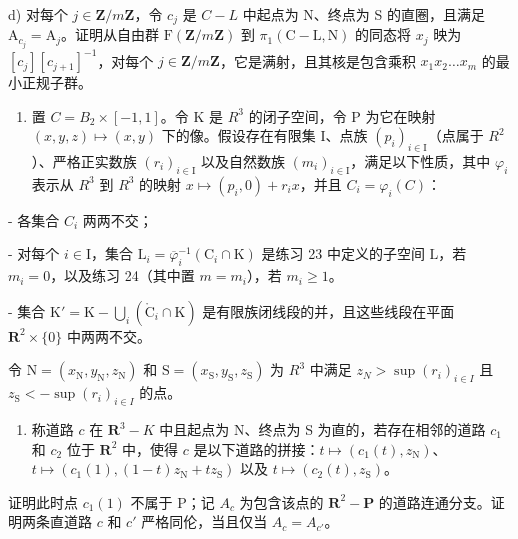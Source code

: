 d) 对每个 \(j \in \mathbf{Z}/m\mathbf{Z}\)，令 \(c_j\) 是 \(C-L\) 中起点为 N、终点为 S 的直圈，且满足 \(\mathrm{A}_{c_j} = \mathrm{A}_j\)。证明从自由群 \(\mathrm{F}(\mathbf{Z}/m\mathbf{Z})\) 到 \(\pi_1(\mathrm{C}-\mathrm{L},\mathrm{N})\) 的同态将 \(x_j\) 映为 \([c_j][c_{j+1}]^{-1}\)，对每个 \(j \in \mathbf{Z}/m\mathbf{Z}\)，它是满射，且其核是包含乘积 \(x_1x_2 \ldots x_m\) 的最小正规子群。

\begin{enumerate}
\def\labelenumi{\arabic{enumi})}
\setcounter{enumi}{24}
\tightlist
\item
   置 \(C = B_{2} \times [-1, 1]\)。令 K 是 \(R^{3}\) 的闭子空间，令 P 为它在映射 \((x, y, z) \mapsto (x, y)\) 下的像。假设存在有限集 I、点族 \((p_{i})_{i \in \mathrm{I}}\)（点属于 \(R^{2}\)）、严格正实数族 \((r_{i})_{i \in \mathrm{I}}\) 以及自然数族 \((m_{i})_{i \in \mathrm{I}}\)，满足以下性质，其中 \(\varphi_{i}\) 表示从 \(R^{3}\) 到 \(R^{3}\) 的映射 \(x \mapsto (p_{i}, 0) + r_{i}x\)，并且 \(C_{i} = \varphi_{i}(C) \)：
\end{enumerate}

- 各集合 \(C_{i}\) 两两不交；

- 对每个 \(i \in \mathrm{I}\)，集合 \(\mathrm{L}_i = \overline{\varphi}_i^{-1}(\mathrm{C}_i \cap \mathrm{K})\) 是练习 23 中定义的子空间 \(\mathrm{L}\)，若 \(m_i = 0\)，以及练习 24（其中置 \(m = m_i\)），若 \(m_i \geqslant 1\)。

- 集合 \(\mathrm{K}' = \mathrm{K} - \bigcup_{i} (\mathring{\mathrm{C}}_i \cap \mathrm{K})\) 是有限族闭线段的并，且这些线段在平面 \(\mathbf{R}^2 \times \{0\}\) 中两两不交。

令 \(\mathrm{N} = (x_{\mathrm{N}}, y_{\mathrm{N}}, z_{\mathrm{N}})\) 和 \(\mathrm{S} = (x_{\mathrm{S}}, y_{\mathrm{S}}, z_{\mathrm{S}})\) 为 \(R^{3}\) 中满足 \(z_{N} > \sup(r_{i})_{i \in I}\) 且 \(z_{\mathrm{S}} < -\sup(r_{i})_{i \in I}\) 的点。

\begin{enumerate}
\def\labelenumi{\alph{enumi})}
\tightlist
\item
  称道路 \(c\) 在 \(\mathbf{R}^3-K\) 中且起点为 N、终点为 S 为直的，若存在相邻的道路 \(c_1\) 和 \(c_2\) 位于 \(\mathbf{R}^2\) 中，使得 \(c\) 是以下道路的拼接：\(t \mapsto (c_1(t), z_{\mathrm{N}})\)、\(t \mapsto (c_1(1), (1 - t)z_{\mathrm{N}} + tz_{\mathrm{S}})\) 以及 \(t \mapsto (c_2(t), z_{\mathrm{S}})\)。
\end{enumerate}

证明此时点 \(c_1(1)\) 不属于 P；记 \(A_c\) 为包含该点的 \(\mathbf{R}^2 - \mathbf{P}\) 的道路连通分支。证明两条直道路 \(c\) 和 \(c'\) 严格同伦，当且仅当 \(A_c = A_{c'}\)。


